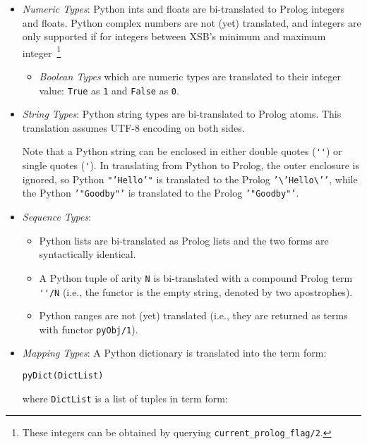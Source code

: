 \begin{itemize}
       \item {\em Numeric Types}: Python ints and floats are
         bi-translated to Prolog integers and floats.  Python complex
         numbers are not (yet) translated, and integers are only
         supported if for integers between XSB's minimum and maximum
         integer~\footnote{These integers can be obtained by querying
           {\tt current\_prolog\_flag/2}.}
         \begin{itemize}
           \item {\em Boolean Types} which are numeric types are
             translated to their integer value: {\tt True} as {\tt 1}
             and {\tt False} as {\tt 0}.
         \end{itemize}
       \item {\em String Types}: Python string types are bi-translated
         to Prolog atoms.  This translation assumes UTF-8 encoding on
         both sides.

         Note that a Python string can be enclosed in either double
         quotes (\verb|''|) or single quotes (\verb|'|).  In
         translating from Python to Prolog, the outer enclosure is
         ignored, so Python {\tt "'Hello'"} is translated to the
         Prolog {\tt '\textbackslash{}'Hello\textbackslash{}'{}'},
         while the Python {\tt '"Goodby"'} is translated to the Prolog
         {\tt '"Goodby"'}.
       \item {\em Sequence Types}:
         \begin{itemize}
           \item Python lists are bi-translated as Prolog lists and
             the two forms are syntactically identical.
           \item A Python tuple of arity {\tt N} is bi-translated with
             a compound Prolog term \verb|''/N| (i.e., the functor is
             the empty string, denoted by two apostrophes).
             \item Python ranges are not (yet) translated (i.e., they
               are returned as terms with functor {\tt pyObj/1}).
         \end{itemize}
       \item {\em Mapping Types}: A Python dictionary is translated
         into the term form:

         {\tt pyDict(DictList)}

         where {\tt DictList} is a list of tuples in term form: 


\end{itemize}
